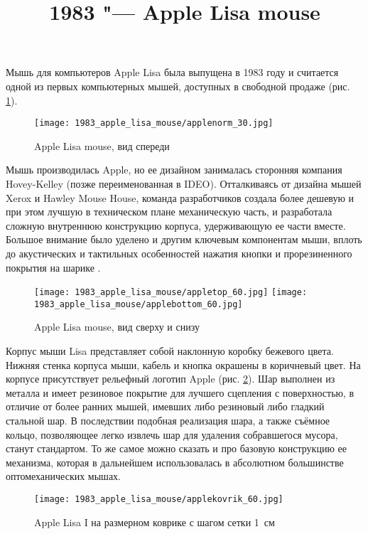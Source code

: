 \documentclass[11pt, a4paper]{article}
\begin{document}
\title{1983 "--- Apple Lisa mouse}
\date{}
\maketitle
{}
Мышь для компьютеров Apple Lisa была выпущена в 1983 году \cite{mouses} и считается одной из первых компьютерных мышей, доступных в свободной продаже (рис. \ref{fig:AppleLisaPic}).

\begin{figure}[h]
   \centering
    \texttt{[image: 1983\_apple\_lisa\_mouse/applenorm\_30.jpg]}
    \caption{Apple Lisa mouse, вид спереди}
    \label{fig:AppleLisaPic}
\end{figure}

Мышь производилась Apple, но ее дизайном занималась сторонняя компания Hovey-Kelley (позже переименованная в IDEO). Отталкиваясь от дизайна мышей Xerox и Hawley Mouse House, команда разработчиков создала более дешевую и при этом лучшую в техническом плане механическую часть, и разработала сложную внутреннюю конструкцию корпуса, удерживающую ее части вместе. Большое внимание было уделено и другим ключевым компонентам мыши, вплоть до акустических и тактильных особенностей нажатия кнопки и прорезиненного покрытия на шарике \cite{ideo}.

\begin{figure}[h]
    \centering
    \texttt{[image: 1983\_apple\_lisa\_mouse/appletop\_60.jpg]}
    \texttt{[image: 1983\_apple\_lisa\_mouse/applebottom\_60.jpg]}
    \caption{Apple Lisa mouse, вид сверху и снизу}
    \label{fig:AppleLisaTopAndBottom}
\end{figure}

Корпус мыши Lisa представляет собой наклонную коробку бежевого цвета. Нижняя стенка корпуса мыши, кабель и кнопка окрашены в коричневый цвет. На корпусе присутствует рельефный логотип Apple (рис. \ref{fig:AppleLisaTopAndBottom}). Шар выполнен из металла и имеет резиновое покрытие для лучшего сцепления с поверхностью, в отличие от более ранних мышей, имевших либо резиновый либо гладкий стальной шар. В последствии подобная реализация шара, а также съёмное кольцо, позволяющее легко извлечь шар для удаления собравшегося мусора, станут стандартом. То же самое можно сказать и про базовую конструкцию ее механизма, которая в дальнейшем использовалась в абсолютном большинстве оптомеханических мышах.

\begin{figure}[h]
    \centering
    \texttt{[image: 1983\_apple\_lisa\_mouse/applekovrik\_60.jpg]}
    \caption{Apple Lisa I на размерном коврике с шагом сетки 1~см}
    \label{fig:AppleLisaSize}
\end{figure}
\end{document}
